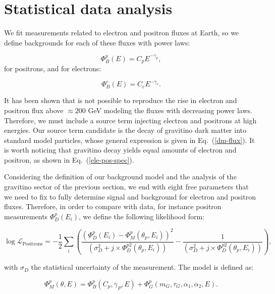 \documentclass[a4paper,11pt]{article}
\begin{document}
\section{Statistical data analysis}

We fit measurements related to electron and positron fluxes at Earth, so we define backgrounds for each of these fluxes with power laws:

\begin{equation}
\Phi_B^p(E) = C_p E^{-\gamma_p}, 
\end{equation}
for positrons, and for electrons:

\begin{equation}
\Phi_B^e(E) = C_e E^{-\gamma_e}.
\end{equation}

It has been shown that is not possible to reproduce the rise in electron and positron flux above $\approx 200$ GeV modeling the fluxes with decreasing power laws. Therefore, we must include a source term injecting electron and positrons at high energies. Our source term candidate is the decay of gravitino dark matter into standard model particles, whose general expression is given in Eq.~(\ref{dm-flux}). It is worth noticing that gravitino decay yields equal amounts of electron and positron, as shown in Eq.~(\ref{ele-pos-spec}). 

Considering the definition of our background model and the analysis of the gravitino sector of the previous section, we end with eight free parameters that we need to fix to fully determine signal and background for electron and positron fluxes. Therefore, in order to compare with data, for instance positron measurements $\Phi_D^p(E_i)$, we define the following likelihood form:

\begin{equation}
\log  \mathcal{L}_{\text{Positrons}} = -\frac{1}{2} \sum_i{\left( \frac{(\Phi_D^p(E_i) - \Phi_M^p(\theta_p,E_i ))^2}{(\sigma_D^2 + j\times \Phi_D^{p2}(\theta_p,E_i))} - \frac{1}{(\sigma_D^2 + j\times \Phi_D^{p2}(\theta_p,E_i))}  \right) },
\end{equation}

\noindent with $\sigma_D$ the statistical uncertainty of the measurement. The model is defined as:

\begin{equation}
\Phi_M^p(\theta,E ) = \Phi_B^p(C_p, \gamma_P, E) + \Phi_{G}^{p}(m_G, \tau_G, \alpha_1, \alpha_2, E).
\end{equation}
\end{document}
